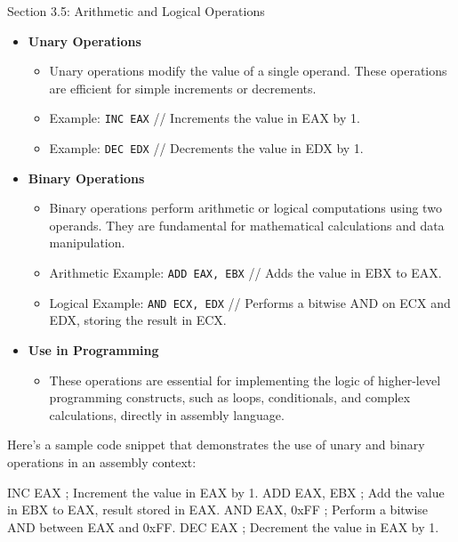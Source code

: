 \begin{notes}{Section 3.5: Arithmetic and Logical Operations}
    \begin{itemize}
        \item \textbf{Unary Operations}
        \begin{itemize}
            \item Unary operations modify the value of a single operand. These operations are efficient for simple increments or decrements.
            \item Example: \texttt{INC EAX} // Increments the value in EAX by 1.
            \item Example: \texttt{DEC EDX} // Decrements the value in EDX by 1.
        \end{itemize}
        \item \textbf{Binary Operations}
        \begin{itemize}
            \item Binary operations perform arithmetic or logical computations using two operands. They are fundamental for mathematical calculations and data manipulation.
            \item Arithmetic Example: \texttt{ADD EAX, EBX} // Adds the value in EBX to EAX.
            \item Logical Example: \texttt{AND ECX, EDX} // Performs a bitwise AND on ECX and EDX, storing the result in ECX.
        \end{itemize}
        \item \textbf{Use in Programming}
        \begin{itemize}
            \item These operations are essential for implementing the logic of higher-level programming constructs, such as loops, conditionals, and complex calculations, directly in assembly language.
        \end{itemize}
    \end{itemize}
    
    \begin{highlight}
        Here's a sample code snippet that demonstrates the use of unary and binary operations in an assembly context:
    
    \begin{code}[Assembly]
    INC EAX                ; Increment the value in EAX by 1.
    ADD EAX, EBX           ; Add the value in EBX to EAX, result stored in EAX.
    AND EAX, 0xFF          ; Perform a bitwise AND between EAX and 0xFF.
    DEC EAX                ; Decrement the value in EAX by 1.
    \end{code}
    

\end{highlight}
\end{notes}
